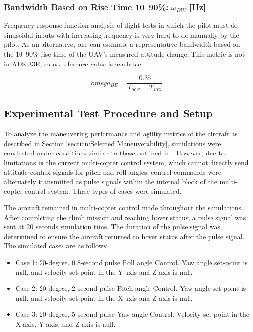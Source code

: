 \subsubsection{Bandwidth Based on Rise Time 10–90\%: \(\omega_{BW}\) [Hz]}
Frequency response function analysis of flight tests in which the pilot must do sinusoidal inputs with increasing frequency is very hard to do manually by the pilot. As an alternative, one can estimate a representative bandwidth based on the 10–90\% rise time of the UAV’s measured attitude change. This metric is not in ADS-33E, so no reference value is available \cite{Dorf2008}.

\begin{equation}
    omega_{BE} = \frac {0.35}{T_{90\%} - T_{10\%}}
\end{equation}

\subsection{Experimental Test Procedure and Setup}

To analyze the maneuvering performance and agility metrics of the aircraft as described in Section \ref{section:Selected Maneuverability}, simulations were conducted under conditions similar to those outlined in \cite{Verbeke}. However, due to limitations in the current multi-copter control system, which cannot directly send attitude control signals for pitch and roll angles, control commands were alternately transmitted as pulse signals within the internal block of the multi-copter control system. Three types of cases were simulated.

The aircraft remained in multi-copter control mode throughout the simulations. After completing the climb mission and reaching hover status, a pulse signal was sent at 20 seconds simulation time. The duration of the pulse signal was determined to ensure the aircraft returned to hover status after the pulse signal. The simulated cases are as follows:

\begin{itemize}
    \item Case 1: 20-degree, 0.8-second pulse Roll angle Control. Yaw angle set-point is null, and velocity set-point in the Y-axis and Z-axis is null.
    \item Case 2: 20-degree, 2-second pulse Pitch angle Control. Yaw angle set-point is null, and velocity set-point in the X-axis and Z-axis is null.
    \item Case 3: 20-degree, 5-second pulse Yaw angle Control. Velocity set-point in the X-axis, Y-axis, and Z-axis is null.
\end{itemize}

